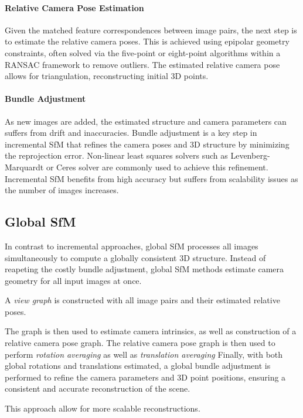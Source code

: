 \paragraph{Relative Camera Pose Estimation}
Given the matched feature correspondences between image pairs, the next step is to estimate the relative camera poses. 
This is achieved using epipolar geometry constraints, often solved via the five-point or eight-point algorithms within a RANSAC framework to remove outliers. 
The estimated relative camera pose allows for triangulation, reconstructing initial 3D points.

\paragraph{Bundle Adjustment}
As new images are added, the estimated structure and camera parameters can suffers from drift and inaccuracies.
Bundle adjustment is a key step in incremental SfM that refines the camera poses and 3D structure by minimizing the reprojection error.
Non-linear least squares solvers such as Levenberg-Marquardt or Ceres solver are commonly used to achieve this refinement. 
Incremental SfM benefits from high accuracy but suffers from scalability issues as the number of images increases.

\subsection{Global SfM}
In contrast to incremental approaches, global SfM processes all images simultaneously to compute a globally consistent 3D structure.
Instead of reapeting the costly bundle adjustment, global SfM methods estimate camera geometry for all input images at once.

A \emph{view graph} is constructed with all image pairs and their estimated relative poses.

The graph is then used to estimate camera intrinsics, as well as construction of a relative camera pose graph.
The relative camera pose graph is then used to perform \emph{rotation averaging} as well as \emph{translation averaging} \cite{Chatterjee2013, theia-manual, moulon2016openmvg}
Finally, with both global rotations and translations estimated, a global bundle adjustment is performed to refine the camera parameters and 3D point positions, ensuring a consistent and accurate reconstruction of the scene.

This approach allow for more scalable reconstructions.

